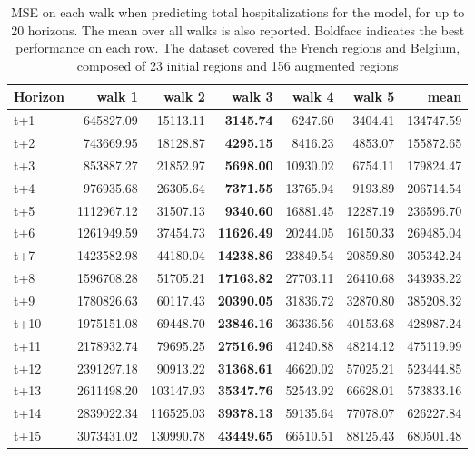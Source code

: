 \begin{table}[H]
\centering
\caption{MSE on each walk when predicting total hospitalizations for the model, for up to 20 horizons. The mean over all walks is also reported. Boldface indicates the best performance on each row. The dataset covered the French regions and Belgium, composed of 23 initial regions and 156 augmented regions }
\label{tab:MSE_walk_custom_linear_regression}
\begin{tabular}{lrrrrrr}
\toprule
Horizon &     walk 1 &    walk 2 &   walk 3 &    walk 4 &    walk 5 &      mean \\
\midrule
t+1  & 645827.09  & 15113.11  & \textbf{3145.74}  & 6247.60  & 3404.41  & 134747.59  \\
t+2  & 743669.95  & 18128.87  & \textbf{4295.15}  & 8416.23  & 4853.07  & 155872.65  \\
t+3  & 853887.27  & 21852.97  & \textbf{5698.00}  & 10930.02  & 6754.11  & 179824.47  \\
t+4  & 976935.68  & 26305.64  & \textbf{7371.55}  & 13765.94  & 9193.89  & 206714.54  \\
t+5  & 1112967.12  & 31507.13  & \textbf{9340.60}  & 16881.45  & 12287.19  & 236596.70  \\
t+6  & 1261949.59  & 37454.73  & \textbf{11626.49}  & 20244.05  & 16150.33  & 269485.04  \\
t+7  & 1423582.98  & 44180.04  & \textbf{14238.86}  & 23849.54  & 20859.80  & 305342.24  \\
t+8  & 1596708.28  & 51705.21  & \textbf{17163.82}  & 27703.11  & 26410.68  & 343938.22  \\
t+9  & 1780826.63  & 60117.43  & \textbf{20390.05}  & 31836.72  & 32870.80  & 385208.32  \\
t+10  & 1975151.08  & 69448.70  & \textbf{23846.16}  & 36336.56  & 40153.68  & 428987.24  \\
t+11  & 2178932.74  & 79695.25  & \textbf{27516.96}  & 41240.88  & 48214.12  & 475119.99  \\
t+12  & 2391297.18  & 90913.22  & \textbf{31368.61}  & 46620.02  & 57025.21  & 523444.85  \\
t+13  & 2611498.20  & 103147.93  & \textbf{35347.76}  & 52543.92  & 66628.01  & 573833.16  \\
t+14  & 2839022.34  & 116525.03  & \textbf{39378.13}  & 59135.64  & 77078.07  & 626227.84  \\
t+15  & 3073431.02  & 130990.78  & \textbf{43449.65}  & 66510.51  & 88125.43  & 680501.48  \\

\end{tabular}
\end{table}
